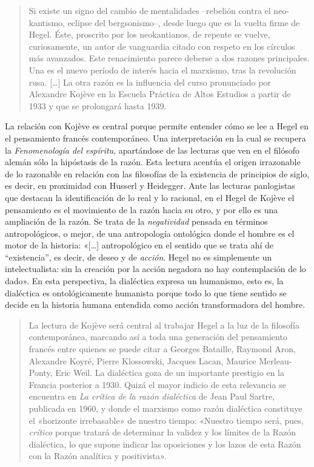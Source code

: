 \begin{quote}
Si existe un signo del cambio de mentalidades --rebelión contra el neo-kantismo, eclipse del bergsonismo--, desde luego que es la vuelta firme de Hegel. Éste, proscrito por los neokantianos, de repente se vuelve, curiosamente, un autor de vanguardia citado con respeto en los círculos más avanzados. Este renacimiento parece deberse a dos razones principales. Una es el nuevo período de interés hacia el marxismo, tras la revolución rusa. {[}\ldots{]} La otra razón es la influencia del curso pronunciado por Alexandre Kojève en la Escuela Práctica de Altos Estudios a partir de 1933 y que se prolongará hasta 1939.
\end{quote}

La relación con Kojève es central porque permite entender cómo se lee a Hegel en el pensamiento francés contemporáneo. Una interpretación en la cual se recupera la \emph{Fenomenología del espíritu}, apartándose de las lecturas que ven en el filósofo alemán sólo la hipóstasis de la razón. Esta lectura acentúa el origen irrazonable de lo razonable en relación con las filosofías de la existencia de principios de siglo, es decir, en proximidad con Husserl y Heidegger. Ante las lecturas panlogistas que destacan la identificación de lo real y lo racional, en el Hegel de Kojève el pensamiento es el movimiento de la razón hacia su otro, y por ello es una ampliación de la razón. Se trata de la \emph{negatividad} pensada en términos antropológicos, o mejor, de una antropología ontológica donde el hombre es el motor de la historia: «{[}\ldots{]} antropológico en el sentido que se trata ahí de ``existencia'', es decir, de deseo y de \emph{acción}. Hegel no es simplemente un intelectualista: sin la creación por la acción negadora no hay contemplación de lo dado». En esta perspectiva, la dialéctica expresa un humanismo, esto es, la dialéctica es ontológicamente humanista porque todo lo que tiene sentido se decide en la historia humana entendida como acción transformadora del hombre.
\begin{quote}
La lectura de Kojève será central al trabajar Hegel a la luz de la filosofía contemporánea, marcando así a toda una generación del pensamiento francés entre quienes se puede citar a Georges Bataille, Raymond Aron, Alexandre Koyré, Pierre Klossowski, Jacques Lacan, Maurice Merleau-Ponty, Eric Weil. La dialéctica goza de un importante prestigio en la Francia posterior a 1930. Quizá el mayor indicio de esta relevancia se encuentra en \emph{La crítica de la razón dialéctica} de Jean Paul Sartre, publicada en 1960, y donde el marxismo como razón dialéctica constituye el «horizonte irrebasable» de nuestro tiempo: «Nuestro tiempo será, pues, \emph{crítico} porque tratará de determinar la validez y los límites de la Razón dialéctica, lo que supone indicar las oposiciones y los lazos de esta Razón con la Razón analítica y positivista».
\end{quote}

